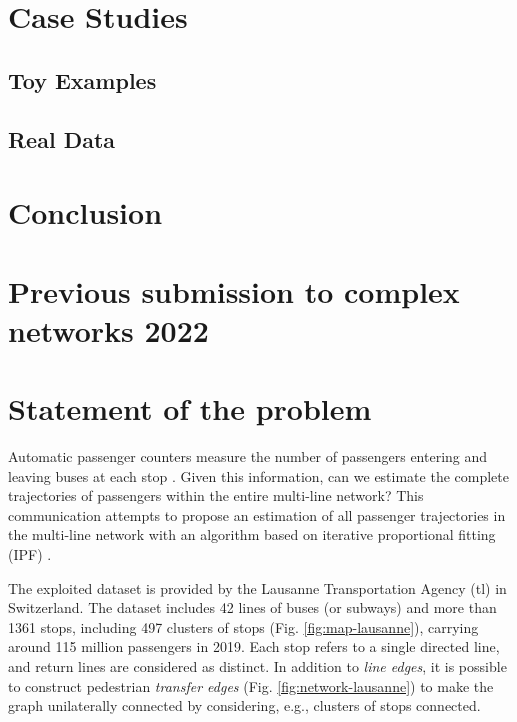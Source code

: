 \documentclass{bmcart}
\begin{document}
 

\section{Case Studies}
\label{casestudies}

\subsection{Toy Examples}

\subsection{Real Data}


\section{Conclusion}

  
\newpage

\section*{Previous submission to complex networks 2022}

%
\section*{Statement of the problem}
%

Automatic passenger counters measure the number of passengers entering and leaving buses at each stop \cite{boyle_passenger_1998}. Given this information, can we estimate the complete trajectories of passengers within the entire multi-line network? This communication attempts to propose an estimation of all passenger trajectories in the multi-line network with an algorithm based on iterative proportional fitting (IPF) \cite{bishop_discrete_2007}.

The exploited dataset is provided by the Lausanne Transportation Agency (tl) in Switzerland. The dataset includes 42 lines of buses (or subways) and more than 1361 stops, including 497 clusters of stops (Fig. \ref{fig:map-lausanne}),  carrying around 115 million passengers in 2019. Each stop refers to a single directed line, and return lines are considered as distinct.  In addition to  \emph{line edges},  it is possible to construct pedestrian \emph{transfer edges} (Fig. \ref{fig:network-lausanne}) to make the graph unilaterally connected by considering, e.g., clusters of stops connected.
\end{document}

